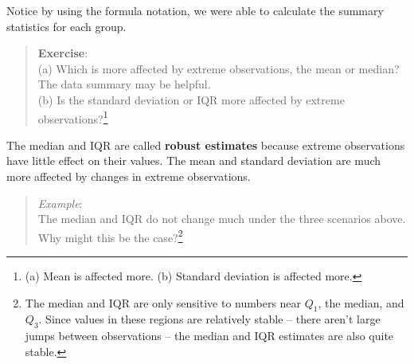 \documentclass[
]{book}
\newenvironment{Shaded}{\begin{snugshade}}{\end{snugshade}}
\newcommand{\AttributeTok}[1]{\textcolor[rgb]{0.77,0.63,0.00}{#1}}
\newcommand{\DecValTok}[1]{\textcolor[rgb]{0.00,0.00,0.81}{#1}}
\newcommand{\FunctionTok}[1]{\textcolor[rgb]{0.00,0.00,0.00}{#1}}
\newcommand{\NormalTok}[1]{#1}
\newcommand{\OtherTok}[1]{\textcolor[rgb]{0.56,0.35,0.01}{#1}}
\newcommand{\SpecialCharTok}[1]{\textcolor[rgb]{0.00,0.00,0.00}{#1}}
\newcommand{\StringTok}[1]{\textcolor[rgb]{0.31,0.60,0.02}{#1}}
\begin{document}
\begin{Shaded}
\end{Shaded}

Notice by using the formula notation, we were able to calculate the summary statistics for each group.

\begin{quote}
\textbf{Exercise}:\\
(a) Which is more affected by extreme observations, the mean or median? The data summary may be helpful.\\
(b) Is the standard deviation or IQR more affected by extreme observations?\footnote{(a) Mean is affected more. (b) Standard deviation is affected more.}
\end{quote}

The median and IQR are called \textbf{robust estimates} because extreme observations have little effect on their values. The mean and standard deviation are much more affected by changes in extreme observations.

\begin{quote}
\emph{Example}:\\
The median and IQR do not change much under the three scenarios above. Why might this be the case?\footnote{The median and IQR are only sensitive to numbers near \(Q_1\), the median, and \(Q_3\). Since values in these regions are relatively stable -- there aren't large jumps between observations -- the median and IQR estimates are also quite stable.}
\end{quote}
\end{document}
